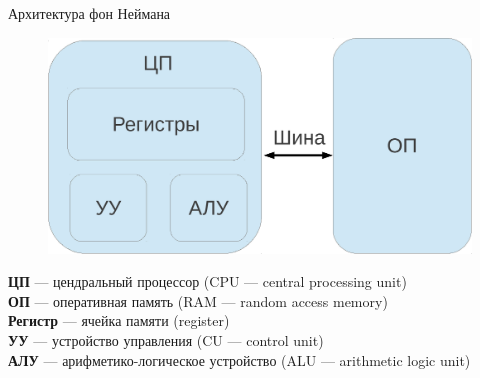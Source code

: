 \documentclass{beamer}
\begin{document}
    \subsection{}
    \begin{frame}{Архитектура фон Неймана}
        \transdissolve
        \begin{figure}
            \centering
            \includegraphics[width=0.8\linewidth]{fig/arch.pdf} 
        \end{figure}
        {\bf ЦП} --- цендральный процессор (CPU --- central processing unit) \\
        {\bf ОП} --- оперативная память (RAM --- random access memory) \\
        {\bf Регистр} --- ячейка памяти (register)\\
        {\bf УУ} --- устройство управления (CU --- control unit)\\
        {\bf АЛУ} --- арифметико-логическое устройство (ALU --- arithmetic logic unit)\\
    \end{frame}
\end{document}
